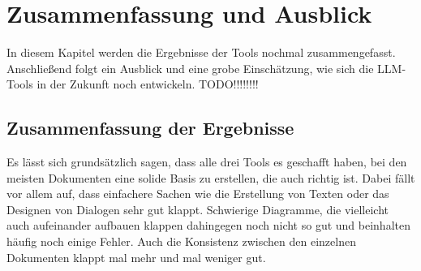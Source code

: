 
\chapter{Zusammenfassung und Ausblick} 

In diesem Kapitel werden die Ergebnisse der Tools nochmal zusammengefasst. Anschließend folgt ein Ausblick 
und eine grobe Einschätzung, wie sich die LLM-Tools in der Zukunft noch entwickeln.
TODO!!!!!!!!

\section{Zusammenfassung der Ergebnisse}  \label{Zusammenfassung der Ergebnisse}

Es lässt sich grundsätzlich sagen, dass alle drei Tools es geschafft haben, bei den meisten Dokumenten eine solide 
Basis zu erstellen, die auch richtig ist. Dabei fällt vor allem auf, dass einfachere Sachen wie die Erstellung von 
Texten oder das Designen von Dialogen sehr gut klappt. Schwierige Diagramme, die vielleicht auch aufeinander 
aufbauen klappen dahingegen noch nicht so gut und beinhalten häufig noch einige Fehler. Auch die Konsistenz 
zwischen den einzelnen Dokumenten klappt mal mehr und mal weniger gut.


